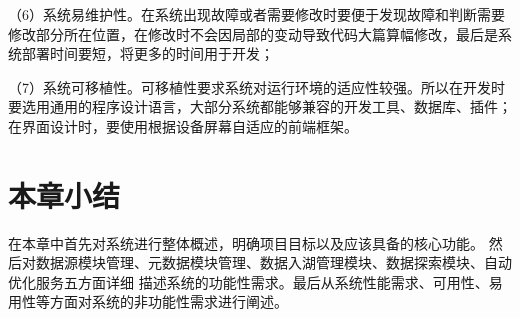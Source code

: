 （6）系统易维护性。在系统出现故障或者需要修改时要便于发现故障和判断需要修改部分所在位置，在修改时不会因局部的变动导致代码大篇算幅修改，最后是系统部署时间要短，将更多的时间用于开发；

（7）系统可移植性。可移植性要求系统对运行环境的适应性较强。所以在开发时要选用通用的程序设计语言，大部分系统都能够兼容的开发工具、数据库、插件；在界面设计时，要使用根据设备屏幕自适应的前端框架。

\section{本章小结}

在本章中首先对系统进行整体概述，明确项目目标以及应该具备的核心功能。
然后对数据源模块管理、元数据模块管理、数据入湖管理模块、数据探索模块、自动优化服务五方面详细
描述系统的功能性需求。最后从系统性能需求、可用性、易用性等方面对系统的非功能性需求进行阐述。
